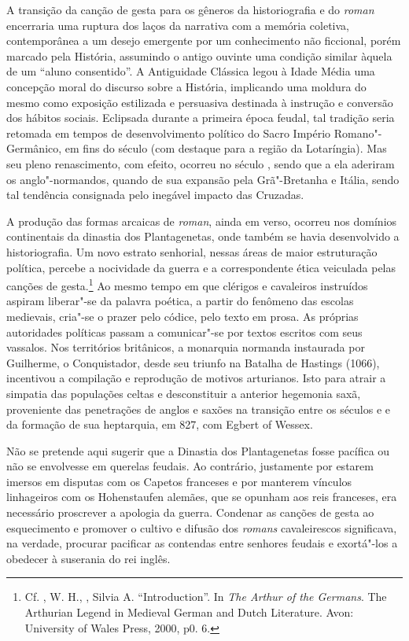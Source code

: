  A transição da canção de gesta para os gêneros da historiografia e do
\textit{roman} encerraria uma ruptura dos laços da narrativa com a memória
coletiva, contemporânea a um desejo emergente por um conhecimento não
ficcional, porém marcado pela História, assumindo o antigo ouvinte uma condição
similar àquela de um “aluno consentido”. A  Antiguidade Clássica legou à Idade
Média uma concepção moral do discurso sobre a História, implicando uma moldura
do mesmo como exposição estilizada e persuasiva destinada à instrução e
conversão dos hábitos sociais. Eclipsada durante a primeira época feudal, tal
tradição seria retomada em tempos de desenvolvimento político do Sacro Império
Romano"-Germânico, em fins do século  (com destaque para a região da
Lotaríngia). Mas seu pleno renascimento, com efeito, ocorreu no século ,
sendo que a ela aderiram os anglo"-normandos, quando de sua expansão pela
Grã"-Bretanha e Itália, sendo tal tendência consignada pelo inegável impacto das
Cruzadas. 

A produção das formas arcaicas de \textit{roman}, ainda em verso, ocorreu nos
domínios continentais da dinastia dos Plantagenetas, onde também se havia
desenvolvido a historiografia. Um novo estrato senhorial, nessas áreas de maior
estruturação política, percebe a nocividade da guerra e a correspondente ética
veiculada pelas canções de gesta.\footnote{ Cf. , W. H., , Silvia
A. “Introduction”. In \textit{The Arthur of the Germans}. The Arthurian Legend
in Medieval German and Dutch Literature. Avon: University of Wales Press,
2000, p0. 6. } Ao mesmo tempo em que clérigos e cavaleiros instruídos aspiram
liberar"-se da palavra poética, a partir do fenômeno das escolas medievais,
cria"-se o prazer pelo códice, pelo texto em prosa. As próprias autoridades políticas
passam a comunicar"-se por textos escritos com seus vassalos. Nos territórios
britânicos, a monarquia normanda instaurada por Guilherme, o Conquistador,
desde seu triunfo na Batalha de Hastings (1066), incentivou a compilação e
reprodução de motivos arturianos. Isto para atrair a simpatia das populações celtas e
desconstituir a anterior hegemonia saxã, proveniente das penetrações de anglos
e saxões na transição entre os séculos  e  e da formação de
sua heptarquia, em 827, com Egbert of Wessex.

Não se pretende aqui sugerir que a Dinastia dos Plantagenetas fosse pacífica ou
não se envolvesse em querelas feudais. Ao contrário, justamente por estarem imersos
em disputas com os Capetos franceses e por manterem vínculos linhageiros com os
Hohenstaufen alemães, que se opunham aos reis franceses, era necessário proscrever a
apologia da guerra. Condenar as canções de gesta ao esquecimento e promover o cultivo
e difusão dos \textit{romans} cavaleirescos significava, na verdade, procurar pacificar as
contendas entre senhores feudais e exortá"-los a obedecer à suserania do rei inglês.

